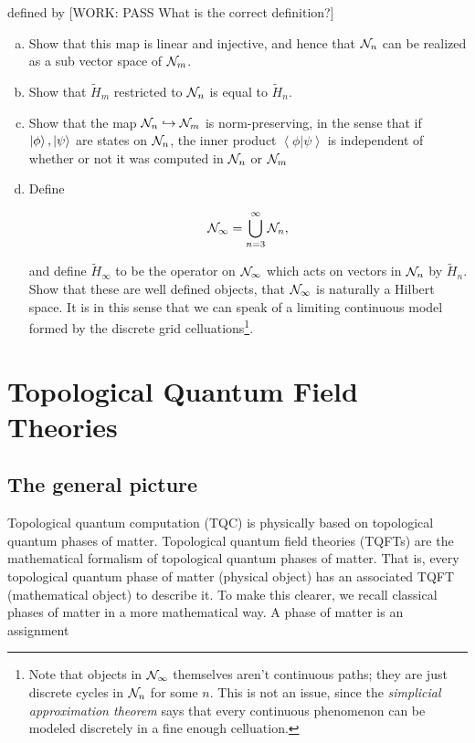 \documentclass{article}
\theoremstyle{definition}
\numberwithin{figure}{section}
\begin{document}
\begin{enumerate}[\thesection .1.]
defined by [WORK: PASS What is the correct definition?]

\begin{enumerate}[(a)]
\item Show that this map is linear and injective, and hence that $\mathcal{N}_{n}$ can be realized as a sub vector space of $\mathcal{N}_{m}$.

\item Show that $\tilde{H}_{m}$ restricted to $\mathcal{N}_{n}$ is equal to $\tilde{H}_n$.

\item  Show that the map $\mathcal{N}_{n}\hookrightarrow{}\mathcal{N}_{m}$ is norm-preserving, in the sense that if $\left|\phi\right>,\left|\psi\right>$ are states on $\mathcal{N}_{n}$, the inner product $\left<\phi | \psi \right>$ is independent of whether or not it was computed in $\mathcal{N}_{n}$ or $\mathcal{N}_{m}$

\item Define

$$\mathcal{N}_{\infty}=\bigcup_{n=3}^{\infty}\mathcal{N}_{n},$$

and define $\tilde{H}_{\infty}$ to be the operator on $\mathcal{N}_{\infty}$ which acts on vectors in $\mathcal{N}_{n}$ by $\tilde{H}_n$. Show that these are well defined objects, that $\mathcal{N}_{\infty}$ is naturally a Hilbert space. It is in this sense that we can speak of a limiting continuous model formed by the discrete grid celluations\footnote{Note that objects in $\mathcal{N}_{\infty}$ themselves aren't continuous paths; they are just discrete cycles in $\mathcal{N}_n$ for some $n$. This is not an issue, since the \textit{simplicial approximation theorem} says that every continuous phenomenon can be modeled discretely in a fine enough celluation.}.
\end{enumerate}
\end{enumerate}

\section{Topological Quantum Field Theories}
\label{TQFTs}

\subsection{The general picture}
\label{The general picture}

Topological quantum computation (TQC) is physically based on topological quantum phases of matter. Topological quantum field theories (TQFTs) are the mathematical formalism of topological quantum phases of matter. That is, every topological quantum phase of matter (physical object) has an associated TQFT (mathematical object) to describe it. To make this clearer, we recall classical phases of matter in a more mathematical way. A phase of matter is an assignment
\end{document}
